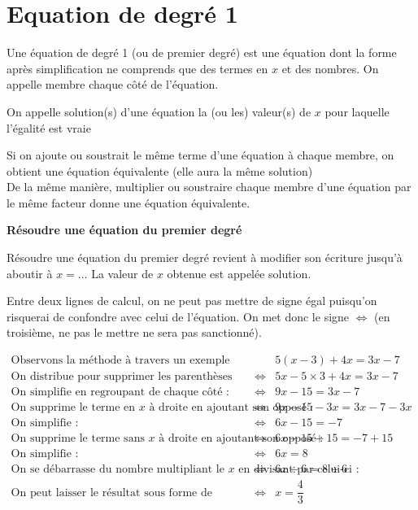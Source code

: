 \section{Equation de degré 1}

{Une équation de degré 1 (ou de premier degré) est une équation dont la forme après simplification ne comprends que des termes en $x$ et des nombres.
On appelle membre chaque côté de l'équation.}


{On appelle solution(s) d'une équation la (ou les) valeur(s) de $x$ pour laquelle l'égalité est vraie}


{Si on ajoute ou soustrait le même terme d'une équation à chaque membre, on obtient une équation équivalente (elle aura la même solution)\\
De la même manière, multiplier ou soustraire chaque membre d'une équation par le même facteur donne une équation équivalente.
}

\textbf{Résoudre une équation du premier degré}

Résoudre une équation du premier degré revient à modifier son écriture jusqu'à aboutir à $x=\dots$
La valeur de $x$ obtenue est appelée solution.

Entre deux lignes de calcul, on ne peut pas mettre de signe égal puisqu'on risquerai de confondre avec celui de l'équation. On met donc le signe $\iff$ (en troisième, ne pas le mettre ne sera pas sanctionné).

\begin{align*}
    \text{Observons la méthode à travers un exemple :}& & &5(x-3)+4x=3x-7\\
    \text{On distribue pour supprimer les parenthèses :}& & \iff & 5x-5\times 3 +4x =3x-7\\
    \text{On simplifie en regroupant de chaque côté :}& & \iff & 9x-15=3x-7\\
    \text{On supprime le terme en $x$ à droite en ajoutant son opposé :} & & \iff & 9x-15-3x=3x-7-3x\\
    \text{On simplifie :}& & \iff &6x-15=-7\\
    \text{On supprime le terme sans $x$ à droite en ajoutant son opposé :}& & \iff &6x-15 +15=-7+15\\
    \text{On simplifie :}& &\iff & 6x=8\\
    \text{On se débarrasse du nombre multipliant le $x$ en divisant par celui-ci :} && \iff &6x\div 6=8\div 6\\
    \text{On peut laisser le résultat sous forme de fraction simplifié :} &&\iff &x=\dfrac{4}{3}
\end{align*}